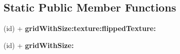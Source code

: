 \subsection*{Static Public Member Functions}
\begin{DoxyCompactItemize}
\item 
\hypertarget{interface_c_c_grid_base_aa126b4850e7e38de451c312f597627f1}{(id) + {\bfseries grid\-With\-Size\-:texture\-:flipped\-Texture\-:}}\label{interface_c_c_grid_base_aa126b4850e7e38de451c312f597627f1}

\item 
\hypertarget{interface_c_c_grid_base_a3942d771eb092223d70b407cf85e5316}{(id) + {\bfseries grid\-With\-Size\-:}}\label{interface_c_c_grid_base_a3942d771eb092223d70b407cf85e5316}

\end{DoxyCompactItemize}
